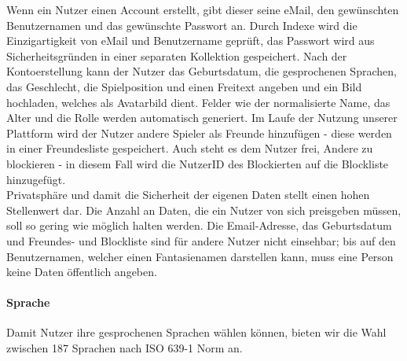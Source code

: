 Wenn ein Nutzer einen Account erstellt, gibt dieser seine eMail, den gewünschten Benutzernamen und das gewünschte Passwort an. Durch Indexe wird die Einzigartigkeit von eMail und Benutzername geprüft, das Passwort wird aus Sicherheitsgründen in einer separaten Kollektion gespeichert. Nach der Kontoerstellung kann der Nutzer das Geburtsdatum, die gesprochenen Sprachen, das Geschlecht, die Spielposition und einen Freitext angeben und ein Bild hochladen, welches als Avatarbild dient. Felder wie der normalisierte Name, das Alter und die Rolle werden automatisch generiert. Im Laufe der Nutzung unserer Plattform wird der Nutzer andere Spieler als Freunde hinzufügen - diese werden in einer Freundesliste gespeichert. Auch steht es dem Nutzer frei, Andere zu blockieren - in diesem Fall wird die NutzerID des Blockierten auf die Blockliste hinzugefügt. \\
Privatsphäre und damit die Sicherheit der eigenen Daten stellt einen hohen Stellenwert dar. Die Anzahl an Daten, die ein Nutzer von sich preisgeben müssen, soll so gering wie möglich halten werden. Die Email-Adresse, das Geburtsdatum und Freundes- und Blockliste sind für andere Nutzer nicht einsehbar; bis auf den Benutzernamen, welcher einen Fantasienamen darstellen kann, muss eine Person keine Daten öffentlich angeben.

\paragraph{Sprache\\}
Damit Nutzer ihre gesprochenen Sprachen wählen können, bieten wir die Wahl zwischen 187 Sprachen nach ISO 639-1 Norm an.\cite{ISO639-1}\\

